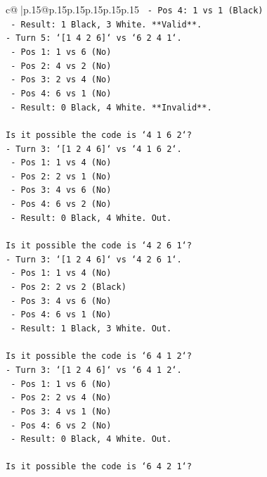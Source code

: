 \documentclass{article}
\begin{document}
{\begin{supertabular}{c@{$\;$}|p{.15\linewidth}@{}p{.15\linewidth}p{.15\linewidth}p{.15\linewidth}p{.15\linewidth}p{.15\linewidth}}
{{{\texttt{  {-} Pos 4: 1 vs 1 (Black)} \\
\texttt{  {-} Result: 1 Black, 3 White. **Valid**.} \\
\texttt{{-} Turn 5: `{[}1 4 2 6{]}` vs `6 2 4 1`.} \\
\texttt{  {-} Pos 1: 1 vs 6 (No)} \\
\texttt{  {-} Pos 2: 4 vs 2 (No)} \\
\texttt{  {-} Pos 3: 2 vs 4 (No)} \\
\texttt{  {-} Pos 4: 6 vs 1 (No)} \\
\texttt{  {-} Result: 0 Black, 4 White. **Invalid**.} \\
\\ 
\texttt{Is it possible the code is `4 1 6 2`?} \\
\texttt{{-} Turn 3: `{[}1 2 4 6{]}` vs `4 1 6 2`.} \\
\texttt{  {-} Pos 1: 1 vs 4 (No)} \\
\texttt{  {-} Pos 2: 2 vs 1 (No)} \\
\texttt{  {-} Pos 3: 4 vs 6 (No)} \\
\texttt{  {-} Pos 4: 6 vs 2 (No)} \\
\texttt{  {-} Result: 0 Black, 4 White. Out.} \\
\\ 
\texttt{Is it possible the code is `4 2 6 1`?} \\
\texttt{{-} Turn 3: `{[}1 2 4 6{]}` vs `4 2 6 1`.} \\
\texttt{  {-} Pos 1: 1 vs 4 (No)} \\
\texttt{  {-} Pos 2: 2 vs 2 (Black)} \\
\texttt{  {-} Pos 3: 4 vs 6 (No)} \\
\texttt{  {-} Pos 4: 6 vs 1 (No)} \\
\texttt{  {-} Result: 1 Black, 3 White. Out.} \\
\\ 
\texttt{Is it possible the code is `6 4 1 2`?} \\
\texttt{{-} Turn 3: `{[}1 2 4 6{]}` vs `6 4 1 2`.} \\
\texttt{  {-} Pos 1: 1 vs 6 (No)} \\
\texttt{  {-} Pos 2: 2 vs 4 (No)} \\
\texttt{  {-} Pos 3: 4 vs 1 (No)} \\
\texttt{  {-} Pos 4: 6 vs 2 (No)} \\
\texttt{  {-} Result: 0 Black, 4 White. Out.} \\
\\ 
\texttt{Is it possible the code is `6 4 2 1`?} \\
}}}
\end{supertabular}}
\end{document}
